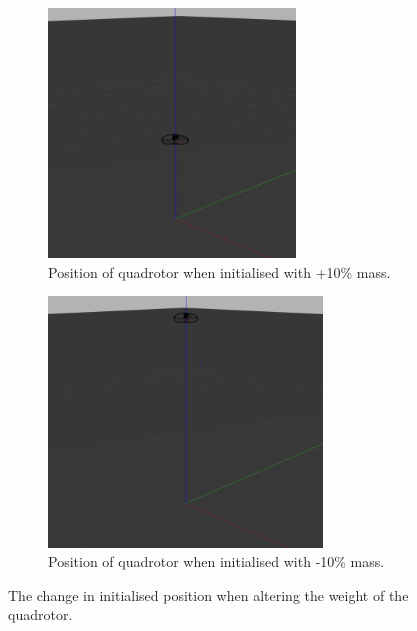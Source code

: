 \begin{figure}[H]
     \centering
     \begin{subfigure}[b]{0.49\textwidth}
         \centering
         \captionsetup{justification=centering}
         \includegraphics[width=0.72\textwidth]{figures/6_/quadrotor+10.png}
         \caption{Position of quadrotor when initialised with +10\% mass.}
         \label{fig:6_quadrotor+10}
     \end{subfigure} 
     \hfill 
    \begin{subfigure}[b]{0.49\textwidth}
         \centering
         \captionsetup{justification=centering}
         \includegraphics[width=0.8\textwidth]{figures/6_/quadrotor-10.png}
         \caption{Position of quadrotor when initialised with -10\% mass.}
         \label{fig:6_quadrotor-10}
     \end{subfigure} 
    \caption{The change in initialised position when altering the weight of the quadrotor.}
    \label{fig:6_quadrotor_mass}
\end{figure}
